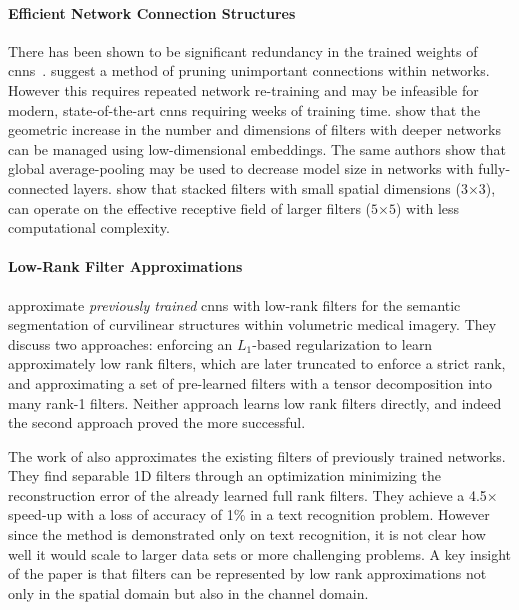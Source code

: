 \documentclass[thesis]{subfiles}
\begin{document}
    \paragraph{Efficient Network Connection Structures}
    There has been shown to be significant redundancy in the trained weights of \glspl{cnn}~\citep{Denil2013predicting}. \citet{lecun1989optimal} suggest a method of pruning unimportant connections within networks. However this requires repeated network re-training and may be infeasible for modern, state-of-the-art \glspl{cnn} requiring weeks of training time. \citet{Lin2013NiN} show that the geometric increase in the number and dimensions of filters with deeper networks can be managed using low-dimensional embeddings. The same authors show that global average-pooling may be used to decrease model size in networks with fully-connected layers. \citet{Simonyan2014verydeep} show that stacked filters with small spatial dimensions (\eg $3$$\times$$3$), can operate on the effective receptive field of larger filters (\eg $5$$\times$$5$) with less computational complexity.
    
    \paragraph{Low-Rank Filter Approximations}
    \label{approxmethods}
    \citet{conf/cvpr/RigamontiSLF13} approximate {\em previously trained} \glspl{cnn} with low-rank filters for the semantic segmentation of curvilinear structures within volumetric medical imagery. They discuss two approaches: enforcing an $L_1$-based regularization to learn approximately low rank filters, which are later truncated to enforce a strict rank, and approximating a set of pre-learned filters with a tensor decomposition into many rank-1 filters. Neither approach learns low rank filters directly, and indeed the second approach proved the more successful.
    
    The work of \citet{journals/corr/JaderbergVZ14} also approximates the existing filters of previously trained networks. They find separable 1D filters through an optimization minimizing the reconstruction error of the already learned full rank filters. They achieve a 4.5$\times$ speed-up with a loss of accuracy of 1\% in a text recognition problem. However since the method is demonstrated only on text recognition, it is not clear how well it would scale to larger data sets or more challenging problems. A key insight of the paper is that filters can be represented by low rank approximations not only in the spatial domain but also in the channel domain.
    
\end{document}
